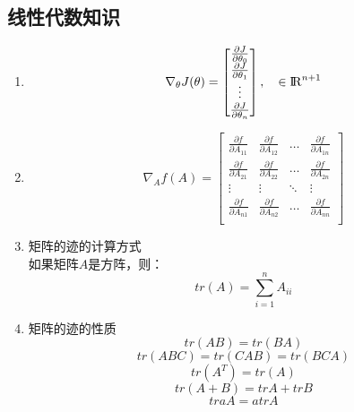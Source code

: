 \subsection{线性代数知识}
\begin{enumerate}
	\item
	\begin{equation}
		\nabla_{\theta}J(\theta) = \left[\begin{matrix}
		\frac{\partial J}{\partial\theta_0} \\
		\frac{\partial J}{\partial\theta_1} \\
		\vdots \\
		\frac{\partial J}{\partial\theta_n} \\
		\end{matrix}\right], \quad \in {\rm I\!R}^{n+1}
	\end{equation}

	\item
	\begin{equation}
		\nabla_Af(A) = \left[ \begin{matrix}
			\frac{\partial f}{\partial A_{11}} & \frac{\partial f}{\partial A_{12}} & \dots & \frac{\partial f}{\partial A_{1n}} \\
			\frac{\partial f}{\partial A_{21}} & \frac{\partial f}{\partial A_{22}} & \dots & \frac{\partial f}{\partial A_{2n}} \\
			\vdots & \vdots & \ddots & \vdots \\
			\frac{\partial f}{\partial A_{n1}} & \frac{\partial f}{\partial A_{n2}}& \dots & \frac{\partial f}{\partial A_{nn}} \\
		\end{matrix}\right]
	\end{equation}

	\item 矩阵的迹的计算方式 \\
	如果矩阵$A$是方阵，则：
	\begin{equation}
		tr(A) = \sum_{i=1}^nA_{ii}
	\end{equation}

	\item 矩阵的迹的性质
	\begin{equation}
		tr(AB) = tr(BA)
	\end{equation}
	\begin{equation}
		tr(ABC) = tr(CAB) = tr(BCA)
	\end{equation}
	\begin{equation}
		tr(A^T) = tr(A)
	\end{equation}
	\begin{equation}
		tr(A+B) = trA + trB
	\end{equation}
	\begin{equation}
		traA = atrA
	\end{equation}


\end{enumerate}
